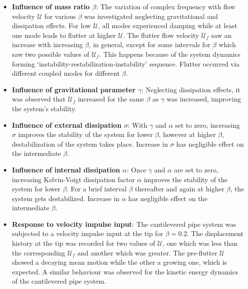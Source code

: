 \documentclass[12pt]{report}
\begin{document}
\begin{itemize}
	\item \textbf{Influence of mass ratio $\beta$}: The variation of complex frequency with flow velocity $\mathcal{U}$ for various $\beta$ was investigated neglecting gravitational and dissipation effects. For low $\mathcal{U}$, all modes experienced damping while at least one mode leads to flutter at higher $\mathcal{U}$. The flutter flow velocity $\mathcal{U}_f$ saw an increase with increasing $\beta$, in general, except for some intervals for $\beta$ which saw two possible values of $\mathcal{U}_f$. This happens because of the system dynamics forming `instability-restabilization-instability' sequence. Flutter occurred via different coupled modes for different $\beta$.
	
	\item \textbf{Influence of gravitational parameter $\gamma$}: Neglecting dissipation effects, it was observed that $\mathcal{U}_f$ increased for the same $\beta$ as $\gamma$ was increased, improving the system's stability.
	
	\item \textbf{Influence of external dissipation $\sigma$}: With $\gamma$ and $\alpha$ set to zero, increasing $\sigma$ improves the stability of the system for lower $\beta$, however at higher $\beta$, destabilization of the system takes place. Increase in $\sigma$ has  negligible effect on the intermediate $\beta$.
	
	\item \textbf{Influence of internal dissipation $\alpha$}: Once $\gamma$ and $\alpha$ are set to zero, increasing Kelvin-Voigt dissipation factor $\alpha$ improves the stability of the system for lower $\beta$. For a brief interval $\beta$ thereafter and again at higher $\beta$, the system gets destabilized. Increase in $\alpha$ has  negligible effect on the intermediate $\beta$.
	
    \item \textbf{Response to velocity impulse input}: The cantilevered pipe system was subjected to a velocity impulse input at the tip for $\beta = 0.2$. The displacement history at the tip was recorded for two values of $\mathcal{U}$, one which was less than the corresponding $\mathcal{U}_f$ and another which was greater. The pre-flutter $\mathcal{U}$ showed a decaying mean motion while the other a growing one, which is expected. A similar behaviour was observed for the kinetic energy dynamics of the cantilevered pipe system.
		
\end{itemize}
\end{document}
